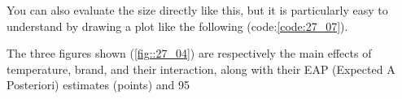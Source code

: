 \documentclass{ltjsarticle}
\begin{document}
You can also evaluate the size directly like this, but it is particularly easy to understand by drawing a plot like the following (code:\ref{code:27_07}).

The three figures shown (\ref{fig::27_04}) are respectively the main effects of temperature, brand, and their interaction, along with their EAP (Expected A Posteriori) estimates (points) and 95%

\end{document}
